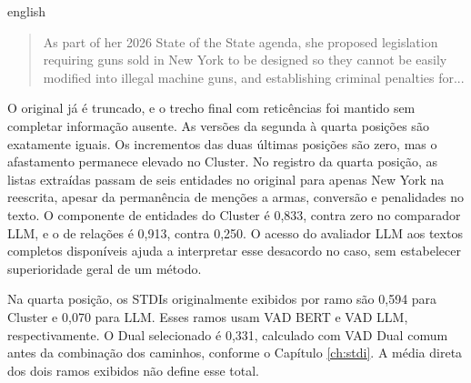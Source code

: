 \begin{otherlanguage*}{english}
\begin{quote}
\begin{SingleSpace}
\small
As part of her 2026 State of the State agenda, she proposed legislation requiring guns sold in New York to be designed so they cannot be easily modified into illegal machine guns, and establishing criminal penalties for...
\end{SingleSpace}
\end{quote}
\end{otherlanguage*}

O original já é truncado, e o trecho final com reticências foi mantido sem completar informação ausente. As versões da segunda à quarta posições são exatamente iguais. Os incrementos das duas últimas posições são zero, mas o afastamento permanece elevado no Cluster. No registro da quarta posição, as listas extraídas passam de seis entidades no original para apenas New York na reescrita, apesar da permanência de menções a armas, conversão e penalidades no texto. O componente de entidades do Cluster é 0,833, contra zero no comparador LLM, e o de relações é 0,913, contra 0,250. O acesso do avaliador LLM aos textos completos disponíveis ajuda a interpretar esse desacordo no caso, sem estabelecer superioridade geral de um método.

Na quarta posição, os STDIs originalmente exibidos por ramo são 0,594 para Cluster e 0,070 para LLM. Esses ramos usam VAD BERT e VAD LLM, respectivamente. O Dual selecionado é 0,331, calculado com VAD Dual comum antes da combinação dos caminhos, conforme o Capítulo \ref{ch:stdi}. A média direta dos dois ramos exibidos não define esse total.
